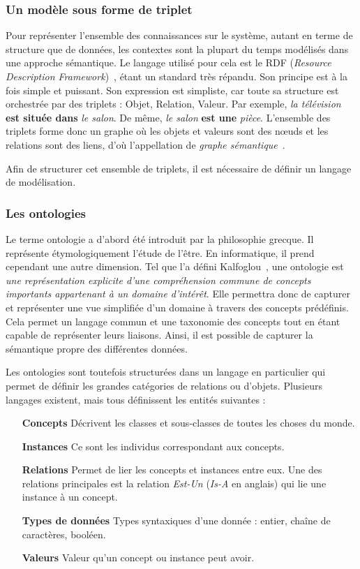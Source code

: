\subsubsection{Un modèle sous forme de triplet}
Pour représenter l'ensemble des connaissances sur le système, autant en terme de structure que de données, les contextes sont la plupart du temps modélisés dans une approche sémantique. Le langage utilisé pour cela est le RDF (\textit{Resource Description Framework})~\cite{W3C:RDF}, étant un standard très répandu. Son principe est à la fois simple et puissant. Son expression est simpliste, car toute sa structure est orchestrée par des triplets : Objet, Relation, Valeur. Par exemple, \textit{la télévision} \textbf{est située dans} \textit{le salon}. De même, \textit{le salon} \textbf{est une} \textit{pièce}. L'ensemble des triplets forme donc un graphe où les objets et valeurs sont des nœuds et les relations sont des liens, d'où l'appellation de \textit{graphe sémantique}~\cite{Minsky:knowledge}.

Afin de structurer cet ensemble de triplets, il est nécessaire de définir un langage de modélisation.

\subsubsection{Les ontologies}
Le terme ontologie a d'abord été introduit par la philosophie grecque. Il représente étymologiquement l'étude de l'être. En informatique, il prend cependant une autre dimension. Tel que l'a défini Kalfoglou~\cite{Kalfoglou:ontology}, une ontologie est \textit{une représentation explicite d'une compréhension commune de concepts importants appartenant à un domaine d'intérêt}.
Elle permettra donc de capturer et représenter une vue simplifiée d'un domaine à travers des concepts prédéfinis. Cela permet un langage commun et une taxonomie des concepts tout en étant capable de représenter leurs liaisons. Ainsi, il est possible de capturer la sémantique propre des différentes données.

Les ontologies sont toutefois structurées dans un langage en particulier qui permet de définir les grandes catégories de relations ou d'objets. Plusieurs langages existent, mais tous définissent les entités suivantes :
\begin{itemize}
    \item[\textbf{Concepts}] Décrivent les classes et sous-classes de toutes les choses du monde.
    \item[\textbf{Instances}] Ce sont les individus correspondant aux concepts.
    \item[\textbf{Relations}] Permet de lier les concepts et instances entre eux. Une des relations principales est la relation \textit{Est-Un} (\textit{Is-A} en anglais) qui lie une instance à un concept.
    \item[\textbf{Types de données}] Types syntaxiques d'une donnée : entier, chaîne de caractères, booléen.
    \item[\textbf{Valeurs}] Valeur qu'un concept ou instance peut avoir.
\end{itemize}

